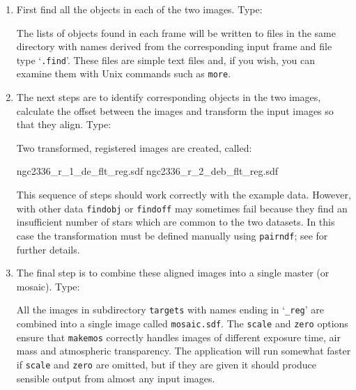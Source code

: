 \documentclass[twoside,11pt]{starlink}
\begin{document}
\begin{enumerate}

  \item First find all the objects in each of the two images.  Type:

\begin{terminalv}
\end{terminalv}

   The lists of objects found in each frame will be written to files
   in the same directory with names derived from the corresponding input
   frame and file type `\texttt{.find}'.  These files are simple text files
   and, if you wish, you can examine them with Unix commands such as
   \texttt{more}.

  \item The next steps are to identify corresponding objects in the two
   images, calculate the offset between the images and transform the
   input images so that they align.  Type:

\begin{terminalv}
\end{terminalv}

   Two transformed, registered images are created, called:

\begin{terminalv}
ngc2336_r_1_de\_flt_reg.sdf
ngc2336_r_2_deb_flt_reg.sdf
\end{terminalv}

   This sequence of steps should work correctly with the example data.
   However, with other data \texttt{findobj} or \texttt{findoff} may sometimes
   fail because they find an insufficient number of stars which are common
   to the two datasets.  In this case the transformation must be defined
   manually using \texttt{pairndf}; see 
   for further details.

  \item The final step is to combine these aligned images into a single
   master (or mosaic).  Type:

\begin{terminalv}
\end{terminalv}

   All the images in subdirectory \texttt{targets} with names ending in
   `\texttt{\_reg}' are combined into a single image called \texttt{mosaic.sdf}.
   The \texttt{scale} and \texttt{zero} options ensure that \texttt{makemos}
   correctly handles images of different exposure time, air mass and
   atmospheric transparency.  The application will run somewhat faster if
   \texttt{scale} and \texttt{zero} are omitted, but if they are given it should
   produce sensible output from almost any input images.


\end{enumerate}
\end{document}
